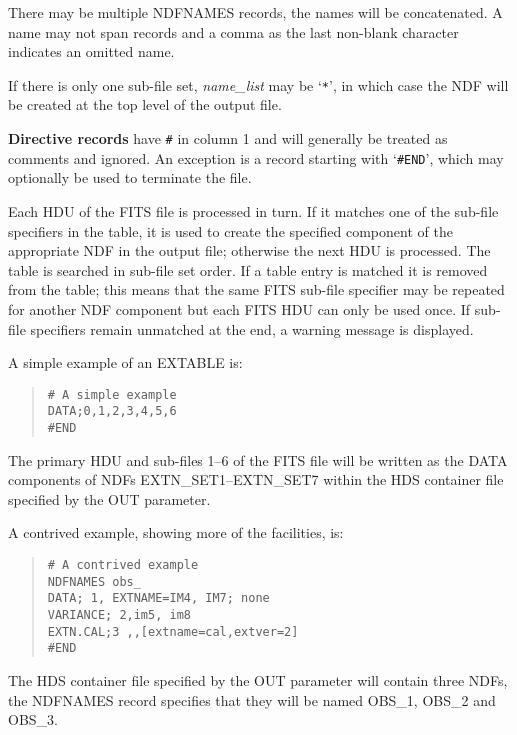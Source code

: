 \documentclass[twoside,11pt]{article}
\begin{document}
{{{           There may be multiple NDFNAMES records, the names will be
           concatenated.  A name may not span records and a comma as the last
           non-blank character indicates an omitted name. 

           If there is only one sub-file set, \textit{name\_list} may be
           `\texttt{*}',
           in which case the NDF will be created at the top level of the output
           file.
           \medskip

        \textbf{Directive records} have \texttt{\#} in column 1 and will
           generally be treated
           as comments and ignored.  An exception is a record starting with
           `\texttt{\#END}', which may optionally be used to terminate the file.
        
        Each HDU of the FITS file is processed in turn. If it matches one 
        of the sub-file specifiers in the table, it is used to create the 
        specified component of the appropriate NDF in the output file;
        otherwise the next HDU is processed. The table is searched in
        sub-file set order.
        If a table entry is matched it is removed from the table; this
        means that the same FITS sub-file specifier may be repeated for
        another NDF component but each FITS HDU can only be used once. 
        If sub-file specifiers remain unmatched at the end, a warning
        message is displayed.
        \bigskip

        A simple example of an EXTABLE is:
        \begin{quote} 
          \texttt{\# A simple example\\
          DATA;0,1,2,3,4,5,6\\
          \#END}
        \end{quote}
        The primary HDU and sub-files 1--6 of the FITS file will be written
        as the DATA components of NDFs EXTN\_SET1--EXTN\_SET7 within the HDS
        container file specified by the OUT parameter.

        A contrived example, showing more of the facilities, is:
        \begin{quote}
          \texttt{\# A contrived example\\
          NDFNAMES obs\_\\
          DATA; 1, EXTNAME=IM4, IM7; none\\
          VARIANCE; 2,im5, im8\\
          EXTN.CAL;3 ,,[extname=cal,extver=2]\\
          \#END}
        \end{quote}
        The HDS container file specified by the OUT parameter will contain
        three NDFs, the NDFNAMES record specifies that they will be named
        OBS\_1, OBS\_2 and OBS\_3.

}}}
\end{document}
